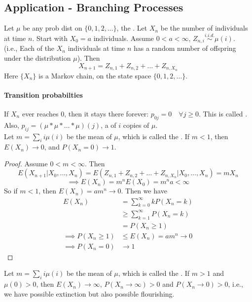 \documentclass[11pt]{article}
\begin{document}
   	\subsection{Application - Branching Processes}
   	Let $\mu$ be any prob dist on $\{0, 1, 2, \hdots\}$, the . Let $X_n$ be the number of individuals at time $n$. Start with $X_0 = a$ individuals. Assume $0 < a < \infty$, $Z_{n,i} \overset{i.i.d.}{\sim} \mu(i)$.\\ (i.e., Each of the $X_n$ individuals at time $n$ has a random number of offspring under the distribution $\mu$). Then 
   	$$X_{n+1} = Z_{n,1} + Z_{n,2} + \hdots + Z_{n,X_n}$$
   	Here $\{X_n\}$ is a Markov chain, on the state space $\{0, 1, 2, \hdots\}$.\\
   	\paragraph{Transition probabilties}
   	If $X_n$ ever reaches 0, then it stays there forever: $p_{0j} = 0\quad \forall j\geq0$. This is called .\\ Also, $p_{ij} = (\mu \ast \mu \ast \hdots \ast \mu)(j)$, a  of $i$ copies of $\mu$.\\
   	\theorem
   	Let $m = \sum_{i}i\mu(i)$ be the mean of $\mu$, which is called the . If $m < 1$, then $E(X_n) \rightarrow 0$, and $P(X_n = 0) \rightarrow 1$.
   	\begin{proof}
   		   	Assume $0 < m < \infty$. Then
   	$$E(X_{n+1}|X_0, \hdots, X_n) = E(Z_{n,1} + Z_{n,2} + \hdots + Z_{n,X_n}|X_0, \hdots, X_n) = mX_n$$
   	$$\implies E(X_n) = m^nE(X_0) = m^n a < \infty$$
   	So if $m < 1$, then $E(X_n) = am^n \rightarrow 0$. Then we have
   	\begin{align*}
   		E(X_n) &= \sum_{k=0}^\infty kP(X_n = k) \\
   		&\geq \sum_{k=1}^\infty P(X_n = k) \\
   		&= P(X_n \geq 1) \\
   		\implies P(X_n \geq 1) &\leq E(X_n) = am^n \rightarrow 0 \\
   		\implies P(X_n = 0) &\rightarrow 1
   	\end{align*}
   	\end{proof}
   	\fact   Let $m = \sum_{i}i\mu(i)$ be the mean of $\mu$, which is called the . If $m > 1$ and $\mu(0) > 0$, then $E(X_n) \rightarrow \infty$, $P(X_n \rightarrow \infty) > 0$ and $P(X_n \rightarrow 0) > 0$, i.e., we have possible extinction but also possible flourishing.
\end{document}
